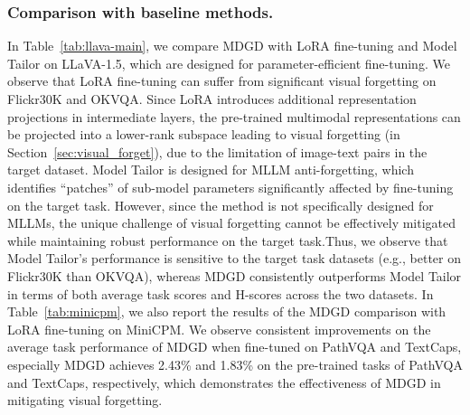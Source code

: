 \subsubsection{Comparison with baseline methods.}
In Table~\ref{tab:llava-main}, we compare MDGD with LoRA fine-tuning and Model Tailor \cite{zhu2024model} on LLaVA-1.5, 
which are designed for parameter-efficient fine-tuning.
We observe that LoRA fine-tuning can suffer from significant visual forgetting on Flickr30K and OKVQA.
Since LoRA introduces additional representation projections in intermediate layers,
the pre-trained multimodal representations can be projected into a lower-rank subspace leading to visual forgetting (in Section~\ref{sec:visual_forget}),
due to the limitation of image-text pairs in the target dataset.
Model Tailor is designed for MLLM anti-forgetting, 
which identifies ``patches'' of sub-model parameters significantly affected by fine-tuning on the target task.
However, since the method is not specifically designed for MLLMs, 
the unique challenge of visual forgetting cannot be effectively mitigated while maintaining robust performance on the target task.Thus, we observe that Model Tailor’s performance is sensitive to the target task datasets (e.g., better on Flickr30K than OKVQA), 
whereas MDGD consistently outperforms Model Tailor in terms of both average task scores and H-scores across the two datasets.
In Table~\ref{tab:minicpm}, we also report the results of the MDGD comparison with LoRA fine-tuning on MiniCPM.
We observe consistent improvements on the average task performance of MDGD when fine-tuned on PathVQA and TextCaps,
especially MDGD achieves 2.43\% and 1.83\% on the pre-trained tasks of PathVQA and TextCaps, respectively,
which demonstrates the effectiveness of MDGD in mitigating visual forgetting. 


